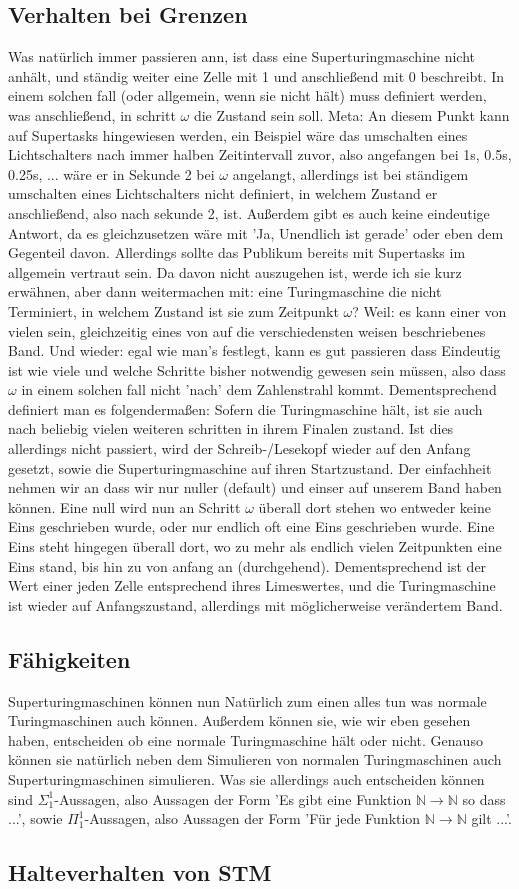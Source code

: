 \documentclass{scrartcl}
\begin{document}
\subsection{Verhalten bei Grenzen}
Was natürlich immer passieren ann, ist dass eine Superturingmaschine nicht
anhält, und ständig weiter eine Zelle mit 1 und anschließend mit 0 beschreibt.
In einem solchen fall (oder allgemein, wenn sie nicht hält) muss definiert
werden, was anschließend, in schritt $\omega$ die Zustand sein soll. Meta: An
diesem Punkt kann auf Supertasks hingewiesen werden, ein Beispiel wäre das
umschalten eines Lichtschalters nach immer halben Zeitintervall zuvor, also
angefangen bei 1s, 0.5s, 0.25s, ... wäre er in Sekunde 2 bei $\omega$
angelangt, allerdings ist bei ständigem umschalten eines Lichtschalters nicht
definiert, in welchem Zustand er anschließend, also nach sekunde 2, ist.
Außerdem gibt es auch keine eindeutige Antwort, da es gleichzusetzen wäre mit
'Ja, Unendlich ist gerade' oder eben dem Gegenteil davon. Allerdings sollte das
Publikum bereits mit Supertasks im allgemein vertraut sein. Da davon nicht
auszugehen ist, werde ich sie kurz erwähnen, aber dann weitermachen mit: eine
Turingmaschine die nicht Terminiert, in welchem Zustand ist sie zum Zeitpunkt
$\omega$? Weil: es kann einer von vielen sein, gleichzeitig eines von auf die
verschiedensten weisen beschriebenes Band. Und wieder: egal wie man's festlegt,
kann es gut passieren dass Eindeutig ist wie viele und welche Schritte bisher
notwendig gewesen sein müssen, also dass $\omega$ in einem solchen fall nicht
'nach' dem Zahlenstrahl kommt. Dementsprechend definiert man es folgendermaßen:
Sofern die Turingmaschine hält, ist sie auch nach beliebig vielen weiteren
schritten in ihrem Finalen zustand. Ist dies allerdings nicht passiert, wird
der Schreib-/Lesekopf wieder auf den Anfang gesetzt, sowie die
Superturingmaschine auf ihren Startzustand. Der einfachheit nehmen wir an dass
wir nur nuller (default) und einser auf unserem Band haben können. Eine null
wird nun an Schritt $\omega$ überall dort stehen wo entweder keine Eins
geschrieben wurde, oder nur endlich oft eine Eins geschrieben wurde. Eine Eins
steht hingegen überall dort, wo zu mehr als endlich vielen Zeitpunkten eine
Eins stand, bis hin zu von anfang an (durchgehend). Dementsprechend ist der
Wert einer jeden Zelle entsprechend ihres Limeswertes, und die Turingmaschine
ist wieder auf Anfangszustand, allerdings mit möglicherweise verändertem Band.

\subsection{Fähigkeiten}
Superturingmaschinen können nun Natürlich zum einen alles tun was normale
Turingmaschinen auch können. Außerdem können sie, wie wir eben gesehen haben,
entscheiden ob eine normale Turingmaschine hält oder nicht. Genauso können sie
natürlich neben dem Simulieren von normalen Turingmaschinen auch
Superturingmaschinen simulieren. Was sie allerdings auch entscheiden können
sind $\Sigma_1^1$-Aussagen, also Aussagen der Form 'Es gibt eine Funktion
$\mathbb{N} \rightarrow \mathbb{N}$ so dass ...', sowie $\Pi^1_1$-Aussagen,
also Aussagen der Form 'Für jede Funktion $\mathbb{N} \rightarrow \mathbb{N}$
gilt ...'. 


\subsection{Halteverhalten von STM}
\end{document}
